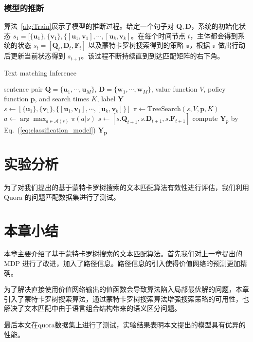 \subsubsection{模型的推断}
算法~\ref{alg:Train}展示了模型的推断过程。给定一个句子对 $\mathbf{Q}, \mathbf{D}$，系统的初始化状态 $s_1=[\{\mathbf{u}_1\}, \{\mathbf{v}_1\}, \{[\mathbf{u}_1,\mathbf{v}_1], \cdots, [\mathbf{u}_k, \mathbf{v}_k]$。在每个时间节点 $t$，主体都会得到系统的状态 $s_t=[\mathbf{Q}_t, \mathbf{D}_t, \mathbf{F}_t]$ 以及蒙特卡罗树搜索得到的策略 $\mathbb{\pi}$，根据 $\mathbb{\pi}$ 做出行动后更新当前状态得到 $s_{t+1}$。该过程不断持续直到到达匹配矩阵的右下角。

\begin{algorithm}[!htbp]
\caption{Text matching Inference}\label{alg:RLRank_MCTS}
\renewcommand{\algorithmicrequire}{\textbf{Input:}}
\renewcommand{\algorithmicensure}{\textbf{Output:}}
\begin{algorithmic}[1]
\Require sentence pair $\mathbf{Q}=\{\mathbf{u}_1, \cdots, \mathbf{u}_M\}$, $\mathbf{D}=\{\mathbf{w}_1, \cdots, \mathbf{w}_M\}$, value function $V$, policy function $\mathbf{p}$, and search times $K$,
\Ensure label $\mathbf{Y}$
\State $s \leftarrow [\{\mathbf{u}_1\}, \{\mathbf{v}_1\}, \{[\mathbf{u}_1,\mathbf{v}_1], \cdots, [\mathbf{u}_k, \mathbf{v}_k]\}]$
  \State $\mathbb{\pi} \leftarrow \mathrm{TreeSearch}(s, V, \mathbf{p}, K)$
  \State $a \leftarrow \arg\max_{a\in\mathcal{A}(s)} \pi(a|s)$
  \State $s \leftarrow [s.\mathbf{Q}_{t+1}, s.\mathbf{D}_{t+1}, s.\mathbf{F}_{t+1}]$
\EndWhile
\State compute $\mathbf{Y}_p$ by Eq.~(\ref{eq:classification_model})
\State \Return $\mathbf{Y_p}$
\end{algorithmic}
\end{algorithm}


\section{实验分析}
为了对我们提出的基于蒙特卡罗树搜索的文本匹配算法有效性进行评估，我们利用 Quora 的问题匹配数据集进行了测试。

\section{本章小结}
本章主要介绍了基于蒙特卡罗树搜索的文本匹配算法。首先我们对上一章提出的 MDP 进行了改进，加入了路径信息。路径信息的引入使得价值网络的预测更加精确。

为了解决直接使用价值网络输出的值函数会导致算法陷入局部最优解的问题，本章引入了蒙特卡罗树搜索算法，通过蒙特卡罗树搜索算法增强搜索策略的可用性，也解决了文本匹配中由于语言组合结构带来的语义区分问题。

最后本文在quora数据集上进行了测试，实验结果表明本文提出的模型具有优异的性能。
